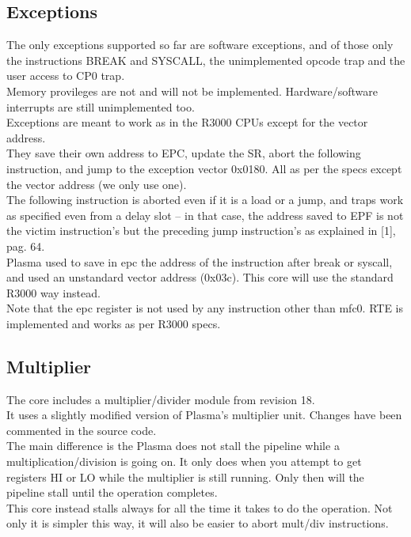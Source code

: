 \documentclass[11pt]{article}
\begin{document}
    
\subsection{Exceptions}
\label{exceptions}

    The only exceptions supported so far are software exceptions, and of those 
    only the instructions BREAK and SYSCALL, the unimplemented opcode trap and
    the user access to CP0 trap.\\
    Memory provileges are not and will not be implemented. Hardware/software 
    interrupts are still unimplemented too.\\
    
    Exceptions are meant to work as in the R3000 CPUs except for the vector 
    address.\\
    They save their own address to EPC, update the SR, abort the following 
    instruction, and jump to the exception vector 0x0180. All as per the specs 
    except the vector address (we only use one).\\
        
    The following instruction is aborted even if it is a load or a jump, and 
    traps work as specified even from a delay slot -- in that case, the address
    saved to EPF is not the victim instruction's but the preceding jump 
    instruction's as explained in [1], pag. 64.\\
    
    Plasma used to save in epc the address of the instruction after break or 
    syscall, and used an unstandard vector address (0x03c). This core will use 
    the standard R3000 way instead.\\
    
    Note that the epc register is not used by any instruction other than mfc0.
    RTE is implemented and works as per R3000 specs.\\


\subsection{Multiplier}
\label{multiplier}

    The core includes a multiplier/divider module from revision 18.\\
    
    It uses a slightly modified version of Plasma's multiplier unit. Changes
    have been commented in the source code.\\
    
    The main difference is the Plasma does not stall the pipeline while a 
    multiplication/division is going on. It only does when you attempt to get 
    registers HI or LO while the multiplier is still running. Only then will
    the pipeline stall until the operation completes.\\
    This core instead stalls always for all the time it takes to do the 
    operation. Not only it is simpler this way, it will also be easier to 
    abort mult/div instructions.\\
    
\end{document}
